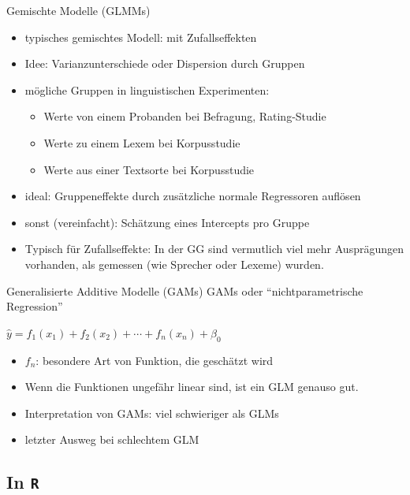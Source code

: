 \begin{frame}
  {Gemischte Modelle (GLMMs)}
  \begin{itemize}[<+->]
    \item typisches gemischtes Modell: \alert{mit Zufallseffekten}
    \item Idee: Varianzunterschiede oder Dispersion durch \alert{Gruppen}
    \item mögliche Gruppen in linguistischen Experimenten:
      \begin{itemize}
	\item Werte von einem Probanden bei Befragung, Rating-Studie
	\item Werte zu einem Lexem bei Korpusstudie
	\item Werte aus einer Textsorte bei Korpusstudie
      \end{itemize}
    \item ideal: Gruppeneffekte durch zusätzliche normale Regressoren auflösen
    \item sonst (vereinfacht): \alert{Schätzung eines Intercepts pro Gruppe}
    \item Typisch für Zufallseffekte: In der GG sind vermutlich viel mehr Ausprägungen\\
      vorhanden, als gemessen (wie \zB Sprecher oder Lexeme) wurden.
  \end{itemize}
\end{frame}

\begin{frame}
  {Generalisierte Additive Modelle (GAMs)}
    GAMs oder \alert{"`nichtparametrische Regression"'}
    \begin{center}
      $\hat{y}=f_1(x_1)+f_2(x_2)+\cdots+f_n(x_n)+\beta_0$
    \end{center}
    \begin{itemize}[<+->]
      \item $f_n$: besondere Art von \alert{Funktion}, die geschätzt wird
      \item Wenn die Funktionen ungefähr linear sind, ist ein GLM genauso gut.
      \item Interpretation von GAMs: viel schwieriger als GLMs
      \item letzter Ausweg bei schlechtem GLM
    \end{itemize}
\end{frame}

\subsection{In \texttt{R}}

